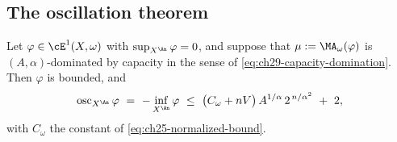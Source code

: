 \subsection{The oscillation theorem}
\label{sec:ch29-linfty}

\begin{theorem}
\label{thm:ch29-kolodziej-linfty}
Let \(\varphi\in\cE^1(X,\omega)\) with \(\sup_{X^{\An}}\varphi=0\), and
suppose that \(\mu:=\MA_\omega(\varphi)\) is \((A,\alpha)\)-dominated by
capacity in the sense of \eqref{eq:ch29-capacity-domination}.  Then
\(\varphi\) is bounded, and
\begin{equation}
\label{eq:ch29-kolodziej-bound}
 \operatorname{osc}_{X^{\An}}\varphi
 \ =\ -\inf_{X^{\An}}\varphi
 \ \leq\ \bigl(C_\omega+nV\bigr)\,A^{1/\alpha}\,2^{\,n/\alpha^2}\ +\ 2 ,
\end{equation}
with \(C_\omega\) the constant of \eqref{eq:ch25-normalized-bound}.
\end{theorem}

